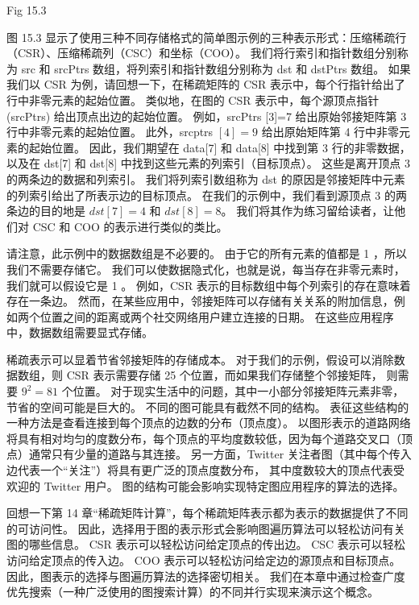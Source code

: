 {\color{red} Fig 15.3}

图 15.3 显示了使用三种不同存储格式的简单图示例的三种表示形式：压缩稀疏行（CSR）、压缩稀疏列（CSC）和坐标（COO）。 
我们将行索引和指针数组分别称为 src 和 srcPtrs 数组，将列索引和指针数组分别称为 dst 和 dstPtrs 数组。 
如果我们以 CSR 为例，请回想一下，在稀疏矩阵的 CSR 表示中，每个行指针给出了行中非零元素的起始位置。 
类似地，在图的 CSR 表示中，每个源顶点指针 (srcPtrs) 给出顶点出边的起始位置。 
例如，srcPtrs [3]=7 给出原始邻接矩阵第 3 行中非零元素的起始位置。 
此外，srcptrs $[4]=9$ 给出原始矩阵第 4 行中非零元素的起始位置。 
因此，我们期望在 data[7] 和 data[8] 中找到第 3 行的非零数据，
以及在 dst[7] 和 dst[8] 中找到这些元素的列索引（目标顶点）。 这些是离开顶点 3 的两条边的数据和列索引。 
我们将列索引数组称为 dst 的原因是邻接矩阵中元素的列索引给出了所表示边的目标顶点。 
在我们的示例中，我们看到源顶点 3 的两条边的目的地是 $d s t[7]=4$ 和 $d s t[8]=8$。 
我们将其作为练习留给读者，让他们对 CSC 和 COO 的表示进行类似的类比。

请注意，此示例中的数据数组是不必要的。 由于它的所有元素的值都是 1 ，所以我们不需要存储它。 
我们可以使数据隐式化，也就是说，每当存在非零元素时，我们就可以假设它是 1 。 
例如，CSR 表示的目标数组中每个列索引的存在意味着存在一条边。 
然而，在某些应用中，邻接矩阵可以存储有关关系的附加信息，例如两个位置之间的距离或两个社交网络用户建立连接的日期。 
在这些应用程序中，数据数组需要显式存储。

稀疏表示可以显着节省邻接矩阵的存储成本。 
对于我们的示例，假设可以消除数据数组，则 CSR 表示需要存储 25 个位置，而如果我们存储整个邻接矩阵，
则需要 $9^{2}=81$ 个位置。 对于现实生活中的问题，其中一小部分邻接矩阵元素非零，节省的空间可能是巨大的。 
不同的图可能具有截然不同的结构。 表征这些结构的一种方法是查看连接到每个顶点的边数的分布（顶点度）。 
以图形表示的道路网络将具有相对均匀的度数分布，每个顶点的平均度数较低，因为每个道路交叉口（顶点）通常只有少量的道路与其连接。 
另一方面，Twitter 关注者图（其中每个传入边代表一个“关注”）将具有更广泛的顶点度数分布，
其中度数较大的顶点代表受欢迎的 Twitter 用户。 图的结构可能会影响实现特定图应用程序的算法的选择。

回想一下第 14 章“稀疏矩阵计算”，每个稀疏矩阵表示都为表示的数据提供了不同的可访问性。 
因此，选择用于图的表示形式会影响图遍历算法可以轻松访问有关图的哪些信息。 CSR 表示可以轻松访问给定顶点的传出边。 
CSC 表示可以轻松访问给定顶点的传入边。 $\mathrm{COO}$ 表示可以轻松访问给定边的源顶点和目标顶点。 
因此，图表示的选择与图遍历算法的选择密切相关。 
我们在本章中通过检查广度优先搜索（一种广泛使用的图搜索计算）的不同并行实现来演示这个概念。


